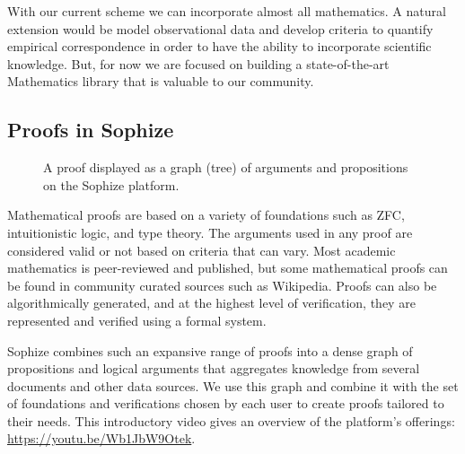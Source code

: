 \documentclass[runningheads]{llncs}
\begin{document}
With our current scheme we can incorporate almost all mathematics. A natural extension would be model observational data and develop criteria to quantify empirical correspondence in order to have the ability to incorporate scientific knowledge. But, for now we are focused on building a state-of-the-art Mathematics library that is valuable to our community.

\subsection*{Proofs in Sophize}

\begin{figure}[!ht]
\begin{center}
\caption{A proof displayed as a graph (tree) of arguments and propositions on the Sophize platform.}
\label{proof_tree}
\end{center}
\end{figure}


Mathematical proofs are based on a variety of foundations such as ZFC, intuitionistic logic, and type theory. The arguments used in any proof are considered valid or not based on criteria that can vary. Most academic mathematics is peer-reviewed and published, but some mathematical proofs can be found in community curated sources such as Wikipedia. Proofs can also be algorithmically generated, and at the highest level of verification, they are represented and verified using a formal system. 

Sophize combines such an expansive range of proofs into a dense graph of propositions and logical arguments that aggregates knowledge from several documents and other data sources. We use this graph and combine it with the set of foundations and verifications chosen by each user to create proofs tailored to their needs. This introductory video gives an overview of the platform's offerings: \url{https://youtu.be/Wb1JbW9Otek}.
\end{document}
